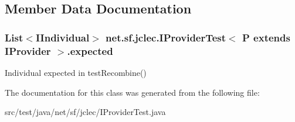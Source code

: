 \subsection{Member Data Documentation}
\hypertarget{classnet_1_1sf_1_1jclec_1_1_i_provider_test_3_01_p_01extends_01_i_provider_01_4_ae603de3f94b3b1a61bd00abdcffbf5b9}{
\subsubsection[{expected}]{\setlength{\rightskip}{0pt plus 5cm}List$<${\bf I\-Individual}$>$ net.\-sf.\-jclec.\-I\-Provider\-Test$<$ P extends {\bf I\-Provider} $>$.expected\hspace{0.3cm}{\ttfamily [protected]}}}\label{classnet_1_1sf_1_1jclec_1_1_i_provider_test_3_01_p_01extends_01_i_provider_01_4_ae603de3f94b3b1a61bd00abdcffbf5b9}
Individual expected in test\-Recombine() 

The documentation for this class was generated from the following file\-:\begin{DoxyCompactItemize}
\item 
src/test/java/net/sf/jclec/I\-Provider\-Test.\-java\end{DoxyCompactItemize}
